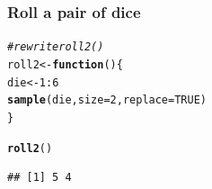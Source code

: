 \documentclass[12pt]{beamer}\usepackage[]{graphicx}\usepackage[]{color}
\makeatletter
\newcommand{\hlnum}[1]{\textcolor[rgb]{0.686,0.059,0.569}{#1}}%
\newcommand{\hlcom}[1]{\textcolor[rgb]{0.678,0.584,0.686}{\textit{#1}}}%
\newcommand{\hlopt}[1]{\textcolor[rgb]{0,0,0}{#1}}%
\newcommand{\hlstd}[1]{\textcolor[rgb]{0.345,0.345,0.345}{#1}}%
\newcommand{\hlkwa}[1]{\textcolor[rgb]{0.161,0.373,0.58}{\textbf{#1}}}%
\newcommand{\hlkwb}[1]{\textcolor[rgb]{0.69,0.353,0.396}{#1}}%
\newcommand{\hlkwc}[1]{\textcolor[rgb]{0.333,0.667,0.333}{#1}}%
\newcommand{\hlkwd}[1]{\textcolor[rgb]{0.737,0.353,0.396}{\textbf{#1}}}%
\newenvironment{kframe}{%
 \def\at@end@of@kframe{}%
 \ifinner\ifhmode%
  \def\at@end@of@kframe{\end{minipage}}%
  \begin{minipage}{\columnwidth}%
 \fi\fi%
 \def\FrameCommand##1{\hskip\@totalleftmargin \hskip-\fboxsep
 \colorbox{shadecolor}{##1}\hskip-\fboxsep
     \hskip-\linewidth \hskip-\@totalleftmargin \hskip\columnwidth}%
 \MakeFramed {\advance\hsize-\width
   \@totalleftmargin\z@ \linewidth\hsize
   \@setminipage}}%
 {\par\unskip\endMakeFramed%
 \at@end@of@kframe}
\newenvironment{knitrout}{}{} %
\makeatother
\begin{document}
\begin{frame}[fragile]
\frametitle{Roll a pair of dice}

\begin{knitrout}\footnotesize
{}\color{fgcolor}\begin{kframe}
\begin{alltt}
\hlcom{# rewrite roll2()}
\hlstd{roll2} \hlkwb{<-} \hlkwa{function}\hlstd{() \{}
  \hlstd{die} \hlkwb{<-} \hlnum{1}\hlopt{:}\hlnum{6}
  \hlkwd{sample}\hlstd{(die,} \hlkwc{size} \hlstd{=} \hlnum{2}\hlstd{,} \hlkwc{replace} \hlstd{=} \hlnum{TRUE}\hlstd{)}
\hlstd{\}}
\end{alltt}
\end{kframe}
\end{knitrout}

\pause
\begin{knitrout}\footnotesize
{}\color{fgcolor}\begin{kframe}
\begin{alltt}
\hlkwd{roll2}\hlstd{()}
\end{alltt}
\begin{verbatim}
## [1] 5 4
\end{verbatim}
\end{kframe}
\end{knitrout}
\end{frame}


\begin{frame}
\begin{center}
\Huge{}
\end{center}
\end{frame}

\end{document}
